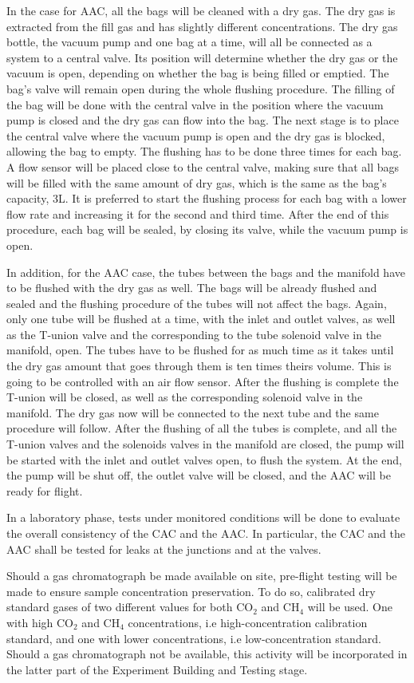 In the case for AAC, all the bags will be cleaned with a dry gas. The dry gas is extracted from the fill gas and has slightly different concentrations. The dry gas bottle, the vacuum pump and one bag at a time, will all be connected as a system to a central valve. Its position will determine whether the dry gas or the vacuum is open, depending on whether the bag is being filled or emptied. The bag's valve will remain open during the whole flushing procedure. The filling of the bag will be done with the central valve in the position where the vacuum pump is closed and the dry gas can flow into the bag. The next stage is to place the central valve where the vacuum pump is open and the dry gas is blocked, allowing the bag to empty. The flushing has to be done three times for each bag. A flow sensor will be placed close to the central valve, making sure that all bags will be filled with the same amount of dry gas, which is the same as the bag's capacity, 3L. It is preferred to start the flushing process for each bag with a lower flow rate and increasing it for the second and third time. After the end of this procedure, each bag will be sealed, by closing its valve, while the vacuum pump is open.

In addition, for the AAC case, the tubes between the bags and the manifold have to be flushed with the dry gas as well. The bags will be already flushed and sealed and the flushing procedure of the tubes will not affect the bags. Again, only one tube will be flushed at a time, with the inlet and outlet valves, as well as the T-union valve and the corresponding to the tube solenoid valve in the manifold, open. The tubes have to be flushed for as much time as it takes until the dry gas amount that goes through them is ten times theirs volume. This is going to be controlled with an air flow sensor. After the flushing is complete the T-union will be closed, as well as the corresponding solenoid valve in the manifold. The dry gas now will be connected to the next tube and the same procedure will follow. After the flushing of all the tubes is complete, and all the T-union valves and the solenoids valves in the manifold are closed, the pump will be started with the inlet and outlet valves open, to flush the system. At the end, the pump will be shut off, the outlet valve will be closed, and the AAC will be ready for flight.   

In a laboratory phase, tests under monitored conditions will be done to evaluate the overall consistency of the CAC and the AAC. In particular, the CAC and the AAC shall be tested for leaks at the junctions and at the valves. 

Should a gas chromatograph be made available on site, pre-flight testing will be made to ensure sample concentration preservation. To do so, calibrated dry standard gases of two different values for both CO$_2$ and CH$_4$ will be used. One with high CO$_2$ and CH$_4$ concentrations, i.e high-concentration calibration standard, and one with lower concentrations, i.e low-concentration standard. Should a gas chromatograph not be available, this activity will be incorporated in the latter part of the Experiment Building and Testing stage.
